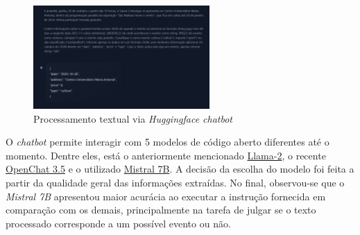 \begin{figure}[h]
    \centering
    \includegraphics[width=0.6\textwidth]{figuras/huggingface-chatbot2.png}
    \caption{Processamento textual via \textit{Huggingface chatbot}}
\end{figure}

O \textit{chatbot} permite interagir com 5 modelos de código aberto diferentes
até o momento. Dentre eles, está o anteriormente mencionado
\href{https://ai.meta.com/llama/}{Llama-2}, o recente
\href{https://github.com/imoneoi/openchat}{OpenChat 3.5} e o utilizado
\href{https://mistral.ai/news/announcing-mistral-7b/}{Mistral 7B}. A decisão da
escolha do modelo foi feita a partir da qualidade geral das informações
extraídas. No final, observou-se que o \textit{Mistral 7B} apresentou maior
acurácia ao executar a instrução fornecida em comparação com os demais,
principalmente na tarefa de julgar se o texto processado corresponde a um
possível evento ou não.


